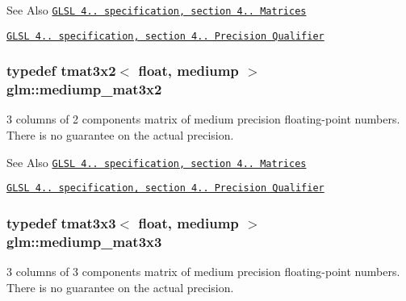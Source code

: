 \begin{DoxySeeAlso}{See Also}
\href{http://www.opengl.org/registry/doc/GLSLangSpec.4.20.8.pdf}{\tt G\-L\-S\-L 4.. specification, section 4.. Matrices} 

\href{http://www.opengl.org/registry/doc/GLSLangSpec.4.20.8.pdf}{\tt G\-L\-S\-L 4.. specification, section 4.. Precision Qualifier} 
\end{DoxySeeAlso}
\hypertarget{group__core__precision_ga2237b9bb71ea5b0d2ae07f9315ccdc28}{
\subsubsection[{mediump\-\_\-mat3x2}]{\setlength{\rightskip}{0pt plus 5cm}typedef tmat3x2$<$ float, mediump $>$ {\bf glm\-::mediump\-\_\-mat3x2}}}\label{group__core__precision_ga2237b9bb71ea5b0d2ae07f9315ccdc28}
3 columns of 2 components matrix of medium precision floating-\/point numbers. There is no guarantee on the actual precision.

\begin{DoxySeeAlso}{See Also}
\href{http://www.opengl.org/registry/doc/GLSLangSpec.4.20.8.pdf}{\tt G\-L\-S\-L 4.. specification, section 4.. Matrices} 

\href{http://www.opengl.org/registry/doc/GLSLangSpec.4.20.8.pdf}{\tt G\-L\-S\-L 4.. specification, section 4.. Precision Qualifier} 
\end{DoxySeeAlso}
\hypertarget{group__core__precision_gae75115c4c4608fccf6827f7a25d95885}{
\subsubsection[{mediump\-\_\-mat3x3}]{\setlength{\rightskip}{0pt plus 5cm}typedef tmat3x3$<$ float, mediump $>$ {\bf glm\-::mediump\-\_\-mat3x3}}}\label{group__core__precision_gae75115c4c4608fccf6827f7a25d95885}
3 columns of 3 components matrix of medium precision floating-\/point numbers. There is no guarantee on the actual precision.

